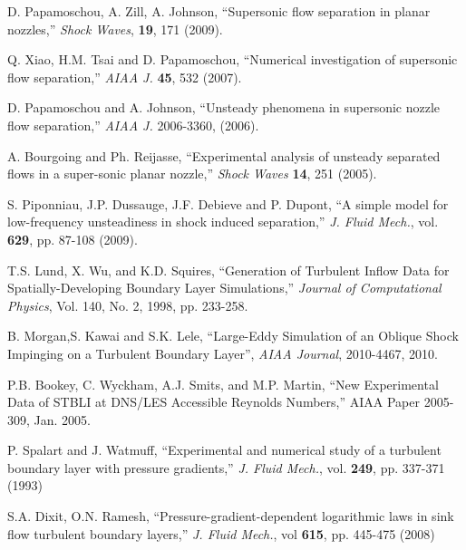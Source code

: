 \documentclass[]{aiaa-tc}%
\begin{document}
\begin{thebibliography}{10}
 	D. Papamoschou, A. Zill, A. Johnson, ``Supersonic flow separation in planar nozzles,'' \emph{Shock Waves}, {\bf 19}, 171 (2009).

 	Q. Xiao, H.M. Tsai and D. Papamoschou, ``Numerical investigation of supersonic flow separation,'' \emph{AIAA J.} {\bf 45}, 532 (2007).
	
 	D. Papamoschou and A. Johnson, ``Unsteady phenomena in supersonic nozzle flow separation,'' \emph{AIAA J.} 2006-3360, (2006).
	
 	A. Bourgoing and Ph. Reijasse, ``Experimental analysis of unsteady separated flows in a super-sonic planar nozzle,'' \emph{Shock Waves} {\bf 14}, 251 (2005).
	
 	S. Piponniau, J.P. Dussauge, J.F. Debieve and P. Dupont, ``A simple model for low-frequency unsteadiness in shock induced separation,'' \emph{J. Fluid Mech.}, vol. {\bf 629}, pp. 87-108 (2009).
	
 	T.S. Lund, X. Wu, and K.D. Squires, ``Generation of Turbulent Inflow Data for Spatially-Developing Boundary Layer 
Simulations,'' \emph{Journal of Computational Physics}, Vol. 140, No. 2, 1998, pp. 233-258.


 	B. Morgan,S. Kawai and S.K. Lele, ``Large-Eddy Simulation of an Oblique Shock Impinging on a 
Turbulent Boundary Layer'', \emph{AIAA Journal}, 2010-4467, 2010.
 	
 	P.B. Bookey, C. Wyckham, A.J. Smits, and M.P. Martin, ``New Experimental Data of STBLI at DNS/LES Accessible 
Reynolds Numbers,''  AIAA Paper 2005-309, Jan. 2005.

	P. Spalart and J. Watmuff, ``Experimental and numerical study of a turbulent boundary layer with pressure gradients,'' \emph{J. Fluid Mech.},
vol. {\bf 249}, pp. 337-371 (1993)	

	S.A. Dixit, O.N. Ramesh, ``Pressure-gradient-dependent logarithmic laws in sink flow turbulent boundary layers,'' \emph{J. Fluid Mech.}, vol {\bf 615}, pp. 445-475 (2008)

 
	
\end{thebibliography}
\end{document}
